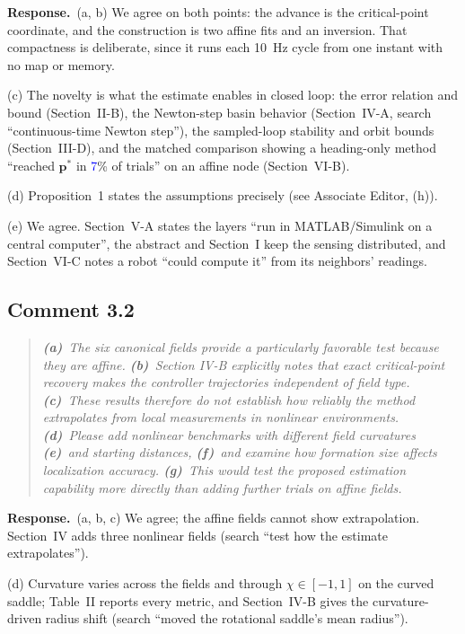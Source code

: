 \documentclass[10pt]{article}
\newcommand{\newnum}[1]{\textcolor{blue}{#1}}        %
\newcommand{\resp}{\par\textbf{Response.}~}
\begin{document}
\resp (a, b) We agree on both points: the advance is the critical-point coordinate, and the construction is two affine fits and an inversion. That compactness is deliberate, since it runs each 10~Hz cycle from one instant with no map or memory.

(c) The novelty is what the estimate enables in closed loop: the error relation and bound (Section~II-B), the Newton-step basin behavior (Section~IV-A, search ``continuous-time Newton step''), the sampled-loop stability and orbit bounds (Section~III-D), and the matched comparison showing a heading-only method ``reached $\mathbf{p}^*$ in \newnum{7}\% of trials'' on an affine node (Section~VI-B).

(d) Proposition~1 states the assumptions precisely (see Associate Editor, (h)).

(e) We agree. Section~V-A states the layers ``run in MATLAB/Simulink on a central computer'', the abstract and Section~I keep the sensing distributed, and Section~VI-C notes a robot ``could compute it'' from its neighbors' readings.

\subsection*{Comment 3.2}

\begin{quote}\itshape
\textbf{(a)}~The six canonical fields provide a particularly favorable test because they are affine.
\textbf{(b)}~Section IV-B explicitly notes that exact critical-point recovery makes the controller trajectories independent of field type.
\textbf{(c)}~These results therefore do not establish how reliably the method extrapolates from local measurements in nonlinear environments.
\textbf{(d)}~Please add nonlinear benchmarks with different field curvatures
\textbf{(e)}~and starting distances,
\textbf{(f)}~and examine how formation size affects localization accuracy.
\textbf{(g)}~This would test the proposed estimation capability more directly than adding further trials on affine fields.
\end{quote}

\resp (a, b, c) We agree; the affine fields cannot show extrapolation. Section~IV adds three nonlinear fields (search ``test how the estimate extrapolates'').

(d) Curvature varies across the fields and through $\chi \in [-1, 1]$ on the curved saddle; Table~II reports every metric, and Section~IV-B gives the curvature-driven radius shift (search ``moved the rotational saddle's mean radius'').
\end{document}
